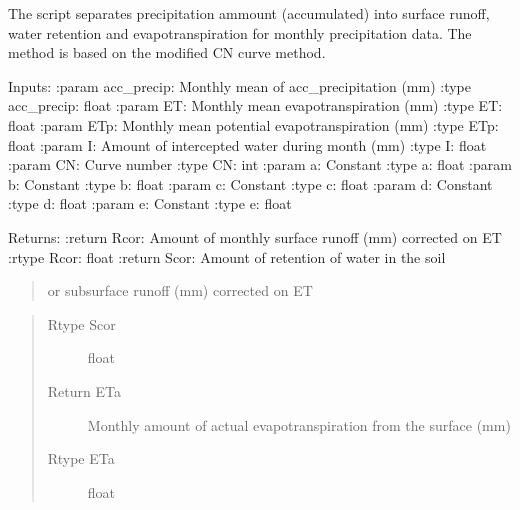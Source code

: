 \documentclass[letterpaper,10pt,english]{sphinxmanual}
\begin{document}
\begin{fulllineitems}
\begin{fulllineitems}
\label{\detokenize{libs:waterflow.WaterBalance.runoffSeparCN}}
The script separates precipitation ammount (accumulated) into 
surface runoff, water retention and evapotranspiration for
monthly precipitation data. The method is based on the modified
CN curve method.

Inputs:
:param acc\_precip: Monthly mean of acc\_precipitation (mm)
:type acc\_precip: float
:param ET: Monthly mean evapotranspiration (mm)
:type ET: float
:param ETp: Monthly mean potential evapotranspiration (mm)
:type ETp: float
:param I: Amount of intercepted water during month (mm)
:type I: float
:param CN: Curve number
:type CN: int
:param a: Constant
:type a: float
:param b: Constant
:type b: float
:param c: Constant
:type c: float
:param d: Constant
:type d: float
:param e: Constant
:type e: float

Returns:
:return Rcor: Amount of monthly surface runoff (mm) corrected on ET
:rtype Rcor: float
:return Scor: Amount of retention of water in the soil
\begin{quote}

or subsurface runoff (mm) corrected on ET
\end{quote}
\begin{quote}\begin{description}
\item[{Rtype Scor}] \leavevmode
float

\item[{Return ETa}] \leavevmode
Monthly amount of actual evapotranspiration 
from the surface (mm)

\item[{Rtype ETa}] \leavevmode
float

\end{description}\end{quote}

\end{fulllineitems}



\end{fulllineitems}
\end{document}
